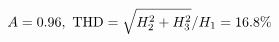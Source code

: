 \documentclass[preview]{standalone}
\begin{document}
\begin{align*}
\special{dvisvgm:raw <g id='unique000'>}A=0.96,\ \text{THD}=\sqrt{H_2^2+H_3^2}/H_1=16.8\%\special{dvisvgm:raw </g>}
\end{align*}
\end{document}
